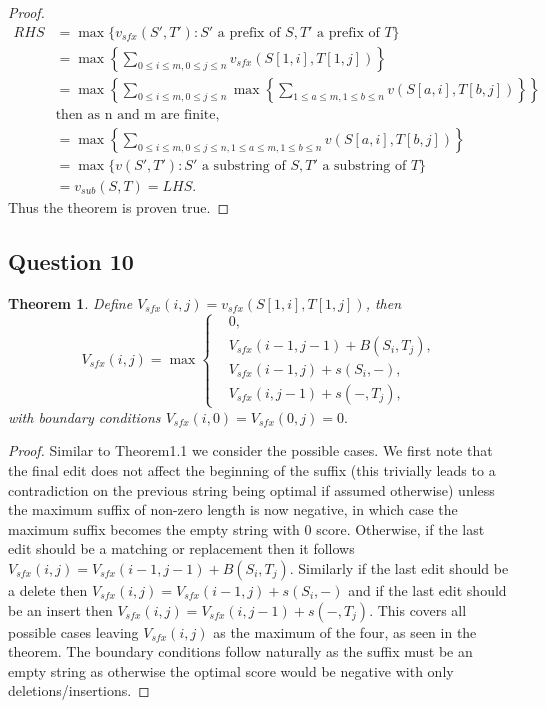\documentclass{article}
\newtheorem{theorem}{Theorem}[section]
\begin{document}
\begin{proof}
\begin{equation*}
\begin{split}
RHS &= \max \{ v_{sfx}(S',T'):S' \text{ a prefix of } S,T' \text{ a prefix of } T \} \\
&= \max \left \{ \sum_{0 \leq i \leq m, 0 \leq j \leq n} v_{sfx}(S[1,i],T[1,j]) \right \} \\
&= \max \left \{ \sum_{0 \leq i \leq m, 0 \leq j \leq n} \max \left \{ \sum_{1 \leq a \leq m,1 \leq b \leq n} v(S[a,i],T[b,j]) \right \} \right \}\\
& \text{then as n and m are finite,} \\
&= \max \left \{ \sum_{0 \leq i \leq m, 0 \leq j \leq n,1 \leq a \leq m,1 \leq b \leq n} v(S[a,i],T[b,j]) \right \} \\
&= \max \{ v(S',T'): S' \text{ a substring of } S, T' \text{ a substring of } T \} \\
&= v_{sub}(S,T) = LHS.
\end{split}
\end{equation*}
Thus the theorem is proven true.
\end{proof}

\subsection{Question 10}

\begin{theorem}
Define $V_{sfx}(i,j) = v_{sfx}(S[1,i],T[1,j])$, then
\begin{equation*}
V_{sfx}(i,j) = \max 
\begin{cases}
&0, \\
&V_{sfx}(i-1,j-1)+B(S_i,T_j), \\
&V_{sfx}(i-1,j)+s(S_i,-), \\
&V_{sfx}(i,j-1)+s(-,T_j),
\end{cases}
\end{equation*}
with boundary conditions $V_{sfx}(i,0)=V_{sfx}(0,j)=0.$
\end{theorem}

\begin{proof}
Similar to Theorem1.1 we consider the possible cases. We first note that the final edit does not affect the beginning of the suffix (this trivially leads to a contradiction on the previous string being optimal if assumed otherwise) unless the maximum suffix of non-zero length is now negative, in which case the maximum suffix becomes the empty string with 0 score. Otherwise, if the last edit should be a matching or replacement then it follows $V_{sfx}(i,j) = V_{sfx}(i-1,j-1)+B(S_i,T_j)$. Similarly if the last edit should be a delete then $V_{sfx}(i,j) = V_{sfx}(i-1,j)+s(S_i,-)$ and if the last edit should be an insert then $V_{sfx}(i,j) =V_{sfx}(i,j-1)+s(-,T_j)$. This covers all possible cases leaving $V_{sfx}(i,j) $ as the maximum of the four, as seen in the theorem. The boundary conditions follow naturally as the suffix must be an empty string as otherwise the optimal score would be negative with only deletions/insertions.
\end{proof}
\end{document}
